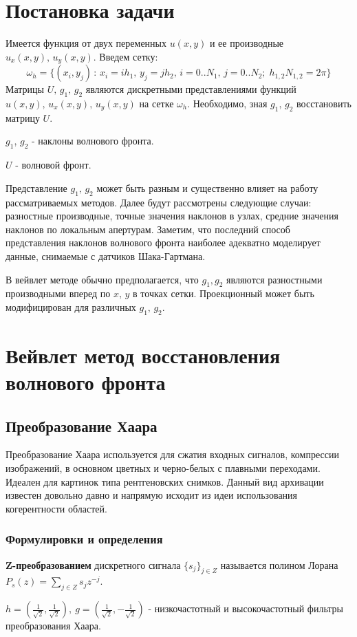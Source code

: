 \documentclass{article}
\begin{document}
\section{Постановка задачи}
Имеется функция от двух переменных $u(x,y)$ и ее производные $u_x(x,y),\, u_y(x,y)$. 
Введем сетку: 
\begin{equation}
\omega_h = \{(x_i, y_j) \,:\, x_i = ih_1,\,y_j = jh_2,\, i = 0..N_1,\, j = 0..N_2;\; h_{1,2}N_{1,2} = 2\pi\}
\end{equation}
Матрицы $U,\, g_1,\, g_2$ являются дискретными представлениями функций $u(x,y) ,\, u_x(x,y) ,\, u_y(x,y)$ на сетке $\omega_h$. Необходимо, зная $g_1,\, g_2$ восстановить матрицу $U$.

$g_1$, $g_2$ - наклоны волнового фронта.

$U$ - волновой фронт.

Представление $g_1 ,\, g_2$ может быть разным и существенно влияет на работу рассматриваемых методов. Далее будут рассмотрены следующие случаи: разностные производные, точные значения наклонов в узлах, средние значения наклонов по локальным апертурам. Заметим, что последний способ представления наклонов волнового фронта наиболее адекватно моделирует данные, снимаемые с датчиков Шака-Гартмана.

В вейвлет методе обычно предполагается, что $g_1, g_2$ являются разностными производными вперед по $x,\,y$ в точках сетки. Проекционный может быть модифицирован для различных $g_1, \, g_2$.
\section{Вейвлет метод восстановления волнового фронта}
\subsection{Преобразование Хаара} 
Преобразование Хаара используется для сжатия входных сигналов, компрессии изображений, в основном цветных и черно-белых с плавными переходами. Идеален для картинок типа рентгеновских снимков. Данный вид архивации известен довольно давно и напрямую исходит из идеи использования когерентности областей.
\subsubsection{Формулировки и определения}
\textbf{Z-преобразованием} дискретного сигнала $\{s_j\}_{ j \in Z}$ называется полином Лорана 
$P_{s}(z) = \sum_{j \in Z} s_{j}z^{-j}$.

$h = (\frac{1}{\sqrt{2}}, \frac{1}{\sqrt{2}}),~g = (\frac{1}{\sqrt{2}}, -\frac{1}{\sqrt{2}})$ - низкочастотный и высокочастотный фильтры преобразования Хаара.
\end{document}
